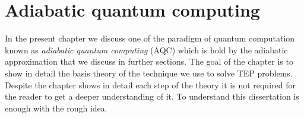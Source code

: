 
\chapter{Adiabatic quantum computing} %

\label{Chapter1} %
In the present chapter we discuss one of the paradigm of quantum computation known as \textit{adiabatic quantum computing} (AQC) which is hold by the adiabatic approximation that we discuss in further sections. The goal of the chapter is to show in detail the basis theory of the technique we use to solve TEP problems. Despite the chapter shows in detail each step of the theory it is not required for the reader to get a deeper understanding of it. To understand this dissertation is enough with the rough idea.
